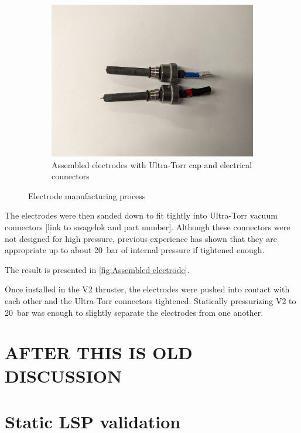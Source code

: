 \begin{figure}[!ht]
\begin{subfigure}[t]{0.30\textwidth}
        \centering
        \includegraphics[width=\textwidth]{assets/3 design/V2 electrodes.jpg}
        \caption{Assembled electrodes with Ultra-Torr cap and electrical connectors}
        \label{fig:Assembled electrode}
    \end{subfigure}

    \caption{Electrode manufacturing process}
\end{figure}

The electrodes were then sanded down to fit tightly into Ultra-Torr vacuum connectors [link to swagelok and part number]. Although these connectors were not designed for high pressure, previous experience has shown that they are appropriate up to about \qty{20}{bar} of internal pressure if tightened enough.

The result is presented in \autoref{fig:Assembled electrode}.

Once installed in the V2 thruster, the electrodes were pushed into contact with each other and the Ultra-Torr connectors tightened. Statically pressurizing V2 to \qty{20}{bar} was enough to slightly separate the electrodes from one another. 


\section*{AFTER THIS IS OLD DISCUSSION}

\section{Static LSP validation}

